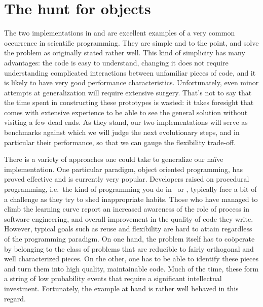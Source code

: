 %
%

\section{The hunt for objects}
\label{sec:classes}

The two implementations in  and  are excellent examples
of a very common occurrence in scientific programming. They are simple and to the point, and
solve the problem as originally stated rather well.  This kind of simplicity has many
advantages: the code is easy to understand, changing it does not require understanding
complicated interactions between unfamiliar pieces of code, and it is likely to have very good
performance characteristics. Unfortunately, even minor attempts at generalization will require
extensive surgery. That's not to say that the time spent in constructing these prototypes is
wasted: it takes foresight that comes with extensive experience to be able to see the general
solution without visiting a few dead ends. As they stand, our two implementations will serve as
benchmarks against which we will judge the next evolutionary steps, and in particular their
performance, so that we can gauge the flexibility trade-off.

There is a variety of approaches one could take to generalize our na\"ive implementation. One
particular paradigm, object oriented programming\supercite{meyer-97}, has proved effective and is
currently very popular. Developers raised on procedural programming, i.e.~the kind of
programming you do in \cc\ or \fortran, typically face a bit of a challenge as they try to shed
inappropriate habits. Those who have managed to climb the learning curve report an increased
awareness of the role of process in software engineering, and overall improvement in the
quality of code they write. However, typical goals such as reuse and flexibility are hard to
attain regardless of the programming paradigm. On one hand, the problem itself has to
co\"operate by belonging to the class of problems that are reducible to fairly orthogonal and
well characterized pieces. On the other, one has to be able to identify these pieces and turn
them into high quality, maintainable code. Much of the time, these form a string of low
probability events that require a significant intellectual investment. Fortunately, the example
at hand is rather well behaved in this regard.

